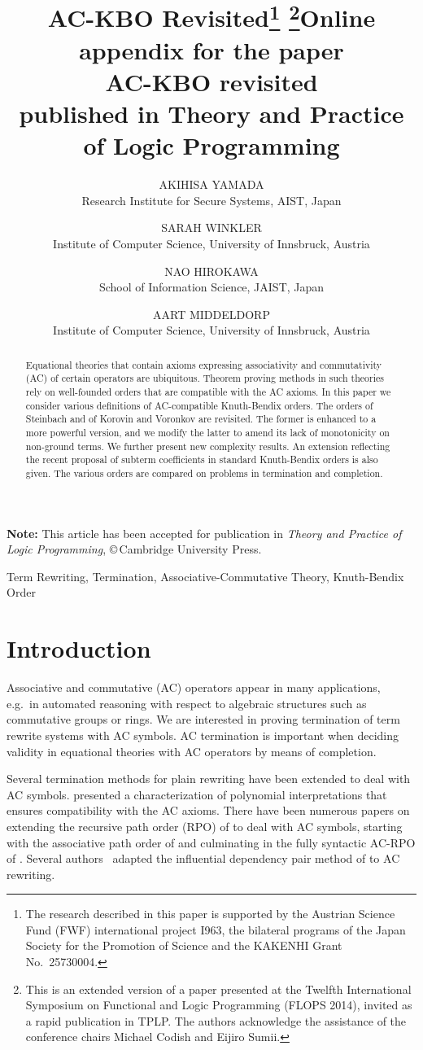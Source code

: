 \documentclass{tlp}
\author[Akihisa Yamada et al.]{AKIHISA YAMADA\\
Research Institute for Secure Systems, AIST, Japan
\and SARAH WINKLER\\
Institute of Computer Science, University of Innsbruck, Austria
\and NAO HIROKAWA\\
School of Information Science, JAIST, Japan 
\and AART MIDDELDORP\\
Institute of Computer Science, University of Innsbruck, Austria
}
\title[AC-KBO Revisited]{AC-KBO Revisited\thanks{The research described in this paper is supported by
	the Austrian Science Fund (FWF) international project I963,
	the bilateral programs of the Japan Society for the Promotion of Science
	and the KAKENHI Grant No.\ 25730004.}
	\thanks{This is an extended version of a paper presented at the Twelfth 
	International Symposium on Functional and Logic Programming (FLOPS 2014), 
	invited as a rapid publication in TPLP. The authors acknowledge the assistance 
	of the conference chairs Michael Codish and Eijiro Sumii.}}
\title[Online appendix]{{\large\textnormal{Online appendix for the paper}}   \\
	AC-KBO revisited
	\\
	{\large\textnormal{published in Theory and Practice of Logic Programming}}
	}
\begin{document}
\maketitle
\ifx\APPENDIX\undefined
\ifx\ARTICLE\undefined
\noindent
{\bf Note:} This article has been accepted for publication in
\emph{Theory and Practice of Logic Programming}, \copyright\,Cambridge
University Press.\\
\enlargethispage{8ex}
\fi
\fi

\ifx\APPENDIX\undefined
\begin{abstract}
Equational theories that contain axioms expressing associativity and
commutativity (AC) of certain operators are ubiquitous. Theorem proving
methods in such theories rely on well-founded orders that are compatible
with the AC axioms.
In this paper we
consider various definitions of AC-compatible Knuth-Bendix orders.
The orders of Steinbach and of Korovin and Voronkov are revisited. The
former is enhanced to a more powerful version, and we modify
the latter to amend its lack of monotonicity on non-ground terms.
We further present new complexity results.
An extension reflecting the recent proposal of subterm coefficients
in standard Knuth-Bendix orders is also given.
The various orders are
compared on problems in termination and completion.
\end{abstract}

\begin{keywords}
Term Rewriting,
Termination,
Associative-Commutative Theory,
Knuth-Bendix Order
\end{keywords}

\section{Introduction}

Associative and commutative (AC) operators appear in many applications,
e.g.\ in automated reasoning with respect to algebraic structures 
such as commutative groups or rings.
We are interested in proving termination of term rewrite systems with AC
symbols. AC termination is important when deciding validity in equational
theories with AC operators by means of completion.

Several termination methods for plain rewriting have been
extended to deal with AC symbols. 
presented a characterization of polynomial interpretations that ensures
compatibility with the AC axioms. There have been numerous
papers on extending the recursive path order (RPO) of
 to deal with AC symbols,
starting with the associative path order
of  and
culminating in the fully syntactic
AC-RPO of .
Several authors~\cite{KT01,MU04,GK01,ALM10} adapted
the influential dependency pair
method of  to AC rewriting.
\end{document}

